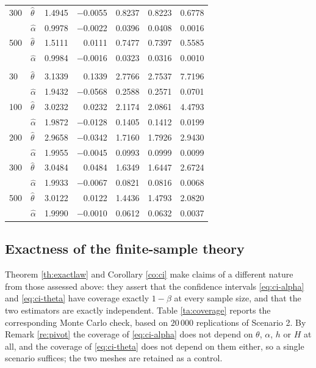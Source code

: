 \documentclass[11pt,reqno]{amsart}
\numberwithin{equation}{section}
\theoremstyle{plain}
\theoremstyle{definition}
\theoremstyle{remark}
\begin{document}
\begin{table}[htbp]
\begin{tabular}{@{}llrrrrr@{}}
300 & $\widehat\theta$  & 1.4945 & $-$0.0055 & 0.8237 & 0.8223 & 0.6778\\
    & $\widehat\alpha$  & 0.9978 & $-$0.0022 & 0.0396 & 0.0408 & 0.0016\\
500 & $\widehat\theta$  & 1.5111 & \phantom{$-$}0.0111 & 0.7477 & 0.7397 & 0.5585\\
    & $\widehat\alpha$  & 0.9984 & $-$0.0016 & 0.0323 & 0.0316 & 0.0010\\
\addlinespace
\multicolumn{7}{@{}l}{\itshape Scenario 3: $\theta=3.0$, $\alpha=2.0$}\\
30  & $\widehat\theta$  & 3.1339 & \phantom{$-$}0.1339 & 2.7766 & 2.7537 & 7.7196\\
    & $\widehat\alpha$  & 1.9432 & $-$0.0568 & 0.2588 & 0.2571 & 0.0701\\
100 & $\widehat\theta$  & 3.0232 & \phantom{$-$}0.0232 & 2.1174 & 2.0861 & 4.4793\\
    & $\widehat\alpha$  & 1.9872 & $-$0.0128 & 0.1405 & 0.1412 & 0.0199\\
200 & $\widehat\theta$  & 2.9658 & $-$0.0342 & 1.7160 & 1.7926 & 2.9430\\
    & $\widehat\alpha$  & 1.9955 & $-$0.0045 & 0.0993 & 0.0999 & 0.0099\\
300 & $\widehat\theta$  & 3.0484 & \phantom{$-$}0.0484 & 1.6349 & 1.6447 & 2.6724\\
    & $\widehat\alpha$  & 1.9933 & $-$0.0067 & 0.0821 & 0.0816 & 0.0068\\
500 & $\widehat\theta$  & 3.0122 & \phantom{$-$}0.0122 & 1.4436 & 1.4793 & 2.0820\\
    & $\widehat\alpha$  & 1.9990 & $-$0.0010 & 0.0612 & 0.0632 & 0.0037\\
\bottomrule
\end{tabular}
\end{table}

\subsection{Exactness of the finite-sample theory}\label{sse:exact}

Theorem \ref{th:exactlaw} and Corollary \ref{co:ci} make claims of a different nature
from those assessed above: they assert that the confidence intervals
\eqref{eq:ci-alpha} and \eqref{eq:ci-theta} have coverage exactly $1-\beta$ at every
sample size, and that the two estimators are exactly independent. Table \ref{ta:coverage}
reports the corresponding Monte Carlo check, based on $20\,000$ replications of
Scenario 2. By Remark \ref{re:pivot} the coverage of \eqref{eq:ci-alpha} does not depend
on $\theta$, $\alpha$, $h$ or $H$ at all, and the coverage of \eqref{eq:ci-theta} does
not depend on them either, so a single scenario suffices; the two meshes are retained as
a control.
\end{document}
